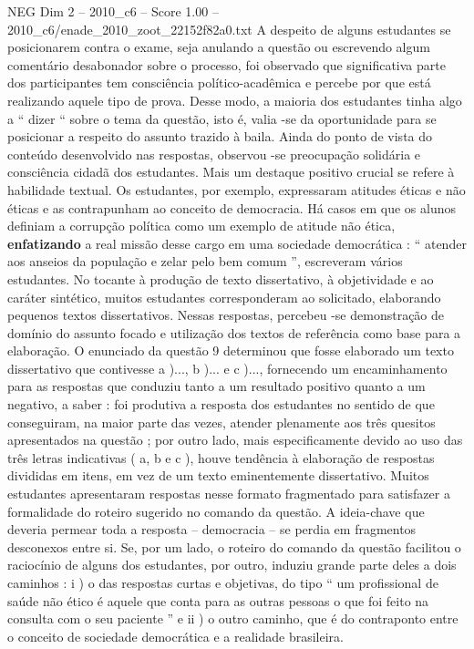 \begin{textsample}{NEG Dim 2 – 2010\_c6 – Score 1.00 – 2010\_c6/enade\_2010\_zoot\_22152f82a0.txt}
A despeito de alguns estudantes se posicionarem contra o exame, seja anulando a questão ou escrevendo algum comentário desabonador sobre o processo, foi observado que significativa parte dos participantes tem consciência político-acadêmica e percebe por que está realizando aquele tipo de prova.
Desse modo, a maioria dos estudantes tinha algo a “ dizer “ sobre o tema da questão, isto é, valia -se da oportunidade para se posicionar a respeito do assunto trazido à baila.
Ainda do ponto de vista do conteúdo desenvolvido nas respostas, observou -se preocupação solidária e consciência cidadã dos estudantes.
Mais um destaque positivo crucial se refere à habilidade textual.
Os estudantes, por exemplo, expressaram atitudes éticas e não éticas e as contrapunham ao conceito de democracia.
Há casos em que os alunos definiam a corrupção política como um exemplo de atitude não ética, \textbf{enfatizando} a real missão desse cargo em uma sociedade democrática : “ atender aos anseios da população e zelar pelo bem comum ”, escreveram vários estudantes.
No tocante à produção de texto dissertativo, à objetividade e ao caráter sintético, muitos estudantes corresponderam ao solicitado, elaborando pequenos textos dissertativos.
Nessas respostas, percebeu -se demonstração de domínio do assunto focado e utilização dos textos de referência como base para a elaboração.
O enunciado da questão 9 determinou que fosse elaborado um texto dissertativo que contivesse a )..., b )... e c )..., fornecendo um encaminhamento para as respostas que conduziu tanto a um resultado positivo quanto a um negativo, a saber : foi produtiva a resposta dos estudantes no sentido de que conseguiram, na maior parte das vezes, atender plenamente aos três quesitos apresentados na questão ; por outro lado, mais especificamente devido ao uso das três letras indicativas ( a, b e c ), houve tendência à elaboração de respostas divididas em itens, em vez de um texto eminentemente dissertativo.
Muitos estudantes apresentaram respostas nesse formato fragmentado para satisfazer a formalidade do roteiro sugerido no comando da questão.
A ideia-chave que deveria permear toda a resposta – democracia – se perdia em fragmentos desconexos entre si.
Se, por um lado, o roteiro do comando da questão facilitou o raciocínio de alguns dos estudantes, por outro, induziu grande parte deles a dois caminhos : i ) o das respostas curtas e objetivas, do tipo “ um profissional de saúde não ético é aquele que conta para as outras pessoas o que foi feito na consulta com o seu paciente ” e ii ) o outro caminho, que é do contraponto entre o conceito de sociedade democrática e a realidade brasileira.

\end{textsample}
